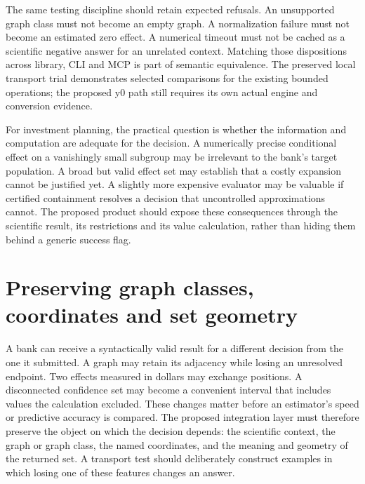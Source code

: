 The same testing discipline should retain expected refusals. An
unsupported graph class must not become an empty graph. A normalization
failure must not become an estimated zero effect. A numerical timeout
must not be cached as a scientific negative answer for an unrelated
context. Matching those dispositions across library, CLI and MCP is part
of semantic equivalence. The preserved local transport trial
demonstrates selected comparisons for the existing bounded operations;
the proposed y0 path still requires its own actual engine and conversion
evidence. \citep{exec13_interchange_runtime}

For investment planning, the practical question is whether the
information and computation are adequate for the decision. A numerically
precise conditional effect on a vanishingly small subgroup may be
irrelevant to the bank's target population. A broad but valid effect set
may establish that a costly expansion cannot be justified yet. A
slightly more expensive evaluator may be valuable if certified
containment resolves a decision that uncontrolled approximations cannot.
The proposed product should expose these consequences through the
scientific result, its restrictions and its value calculation, rather
than hiding them behind a generic success flag.
\label{exec13:interchange-complete-end}


\section{Preserving graph classes, coordinates and set geometry}
\label{exec16:topology}

A bank can receive a syntactically valid result for a different decision from
the one it submitted. A graph may retain its adjacency while losing an
unresolved endpoint. Two effects measured in dollars may exchange positions.
A disconnected confidence set may become a convenient interval that includes
values the calculation excluded. These changes matter before an estimator's
speed or predictive accuracy is compared. The proposed integration layer must
therefore preserve the object on which the decision depends: the scientific
context, the graph or graph class, the named coordinates, and the meaning and
geometry of the returned set. A transport test should deliberately construct
examples in which losing one of these features changes an answer.

